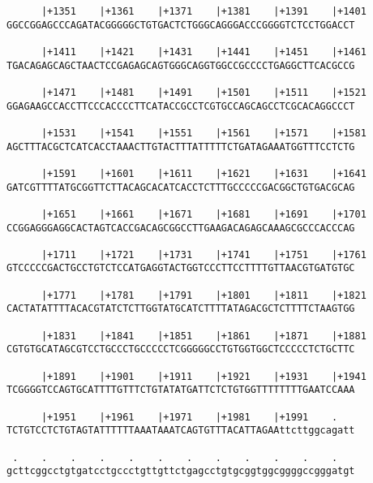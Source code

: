 \documentclass{article}
\begin{document}
\begin{Verbatim}
      |+1351    |+1361    |+1371    |+1381    |+1391    |+1401
GGCCGGAGCCCAGATACGGGGGCTGTGACTCTGGGCAGGGACCCGGGGTCTCCTGGACCT
                                                            
      |+1411    |+1421    |+1431    |+1441    |+1451    |+1461
TGACAGAGCAGCTAACTCCGAGAGCAGTGGGCAGGTGGCCGCCCCTGAGGCTTCACGCCG
                                                            
      |+1471    |+1481    |+1491    |+1501    |+1511    |+1521
GGAGAAGCCACCTTCCCACCCCTTCATACCGCCTCGTGCCAGCAGCCTCGCACAGGCCCT
                                                            
      |+1531    |+1541    |+1551    |+1561    |+1571    |+1581
AGCTTTACGCTCATCACCTAAACTTGTACTTTATTTTTCTGATAGAAATGGTTTCCTCTG
                                                            
      |+1591    |+1601    |+1611    |+1621    |+1631    |+1641
GATCGTTTTATGCGGTTCTTACAGCACATCACCTCTTTGCCCCCGACGGCTGTGACGCAG
                                                            
      |+1651    |+1661    |+1671    |+1681    |+1691    |+1701
CCGGAGGGAGGCACTAGTCACCGACAGCGGCCTTGAAGACAGAGCAAAGCGCCCACCCAG
                                                            
      |+1711    |+1721    |+1731    |+1741    |+1751    |+1761
GTCCCCCGACTGCCTGTCTCCATGAGGTACTGGTCCCTTCCTTTTGTTAACGTGATGTGC
                                                            
      |+1771    |+1781    |+1791    |+1801    |+1811    |+1821
CACTATATTTTACACGTATCTCTTGGTATGCATCTTTTATAGACGCTCTTTTCTAAGTGG
                                                            
      |+1831    |+1841    |+1851    |+1861    |+1871    |+1881
CGTGTGCATAGCGTCCTGCCCTGCCCCCTCGGGGGCCTGTGGTGGCTCCCCCTCTGCTTC
                                                            
      |+1891    |+1901    |+1911    |+1921    |+1931    |+1941
TCGGGGTCCAGTGCATTTTGTTTCTGTATATGATTCTCTGTGGTTTTTTTTGAATCCAAA
                                                            
      |+1951    |+1961    |+1971    |+1981    |+1991    .   
TCTGTCCTCTGTAGTATTTTTTAAATAAATCAGTGTTTACATTAGAAttcttggcagatt
                                                            
 .    .    .    .    .    .    .    .    .    .    .    .   
gcttcggcctgtgatcctgccctgttgttctgagcctgtgcggtggcggggccgggatgt
                                                            

\end{Verbatim}
\end{document}
